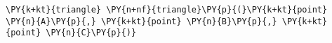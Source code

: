 \begin{Verbatim}[commandchars=\\\{\}]
    \PY{k+kt}{triangle} \PY{n+nf}{triangle}\PY{p}{(}\PY{k+kt}{point} \PY{n}{A}\PY{p}{,} \PY{k+kt}{point} \PY{n}{B}\PY{p}{,} \PY{k+kt}{point} \PY{n}{C}\PY{p}{)}
\end{Verbatim}
